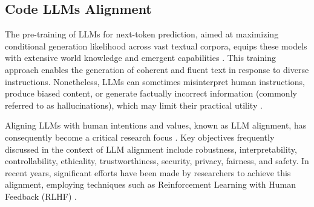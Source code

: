 \subsection{Code LLMs Alignment}\label{sec:responsible_codeai}
The pre-training of LLMs for next-token prediction, aimed at maximizing conditional generation likelihood across vast textual corpora, equips these models with extensive world knowledge and emergent capabilities \cite{brown2020language}. 
This training approach enables the generation of coherent and fluent text in response to diverse instructions. 
Nonetheless, LLMs can sometimes misinterpret human instructions, produce biased content, or generate factually incorrect information (commonly referred to as hallucinations), which may limit their practical utility \cite{wang2023aligning,zhao2023survey,ji2023ai}.

Aligning LLMs with human intentions and values, known as LLM alignment, has consequently become a critical research focus \cite{ji2023ai,wang2023aligning}. 
Key objectives frequently discussed in the context of LLM alignment include robustness, interpretability, controllability, ethicality, trustworthiness, security, privacy, fairness, and safety. 
In recent years, significant efforts have been made by researchers to achieve this alignment, employing techniques such as Reinforcement Learning with Human Feedback (RLHF) \cite{ouyang2022training}.


